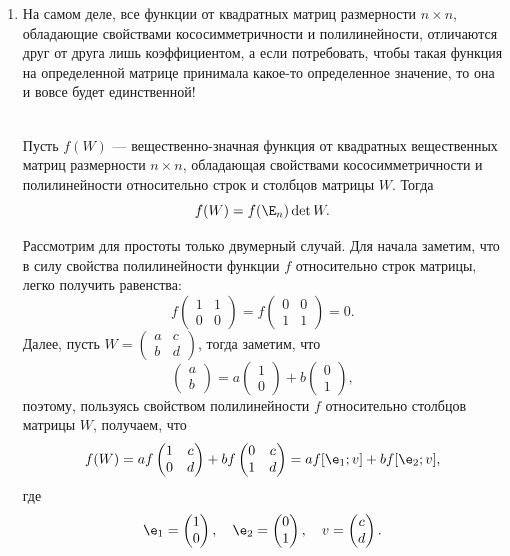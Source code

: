 \begin{enumerate}
\item На самом деле, все функции от квадратных матриц размерности $n\times n$, обладающие свойствами кососимметричности и полилинейности, отличаются друг от друга лишь коэффициентом, а если потребовать, чтобы такая функция на определенной матрице принимала какое-то определенное значение, то она и вовсе будет единственной!
\begin{thrm}\quad\\
Пусть $f(W)$ --- вещественно-значная функция от квадратных вещественных матриц размерности $n\times n$, обладающая свойствами кососимметричности и полилинейности относительно строк и столбцов матрицы $W$.
Тогда
$$
f(W)=f(\E_n)\det W.
$$
\end{thrm}
\pf 
Рассмотрим для простоты только двумерный случай. Для начала заметим, что в силу свойства полилинейности функции $f$ относительно строк матрицы, легко получить равенства:
$$
f\begin{pmatrix}1 & 1 \\ 0 & 0\end{pmatrix}=f\begin{pmatrix}0 & 0 \\ 1 & 1\end{pmatrix}=0.
$$
Далее, пусть $\displaystyle W=\begin{pmatrix}a & c \\ b & d\end{pmatrix}$, тогда заметим, что
$$
\begin{pmatrix}a \\ b\end{pmatrix} = a\begin{pmatrix}1 \\ 0\end{pmatrix}+b\begin{pmatrix}0 \\ 1\end{pmatrix},
$$
поэтому, пользуясь свойством полилинейности $f$ относительно столбцов матрицы $W$, получаем, что
$$
f(W) = a f\begin{pmatrix}1 & c \\ 0 & d\end{pmatrix}+bf\begin{pmatrix}0 & c \\ 1 & d\end{pmatrix}=
a f[\e_1;v] + bf[\e_2;v],
$$
где 
$$
\e_1=\begin{pmatrix}1 \\ 0\end{pmatrix},\quad 
\e_2=\begin{pmatrix}0 \\ 1\end{pmatrix},\quad
v = \begin{pmatrix}c \\ d\end{pmatrix}.
$$


\end{enumerate}
